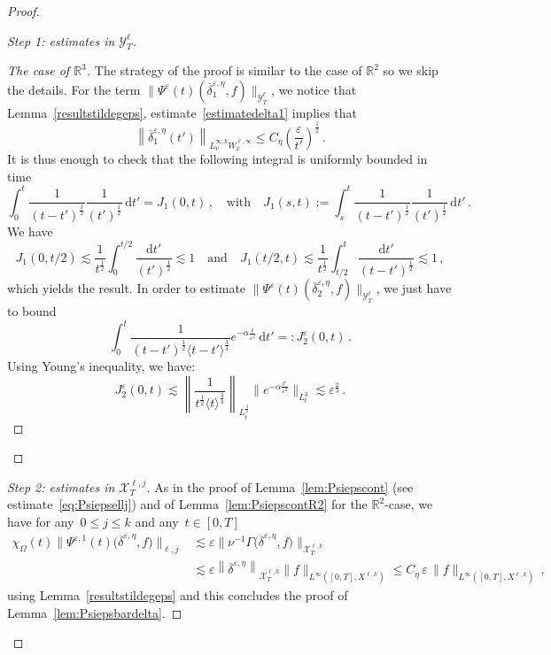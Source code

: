 \documentclass[11pt]{article}
\theoremstyle{definition}
\numberwithin{equation}{section}
\numberwithin{figure}{section}
\numberwithin{table}{section}
\newcommand*{\dd}{\mathrm{d}}
\newcommand*{\dt}{\dd t}
\newenvironment{step}[1]{\begin{proof}[#1]}{\let\qed\relax\end{proof}}
\newenvironment{laststep}[1]{\begin{proof}[#1]}{\end{proof}}
\newcommand*\R {\mathbb{R}}
\newcommand*\eps{{\varepsilon}}
\newcommand*\e{{\varepsilon}}
\begin{document}
\begin{proof}
\begin{step}{Step 1: estimates in $\mathcal{Y}^\ell_T$}
\begin{step}{The case of $\R^3$}
The strategy of the proof is similar to the case of $\R^2$ so we skip the details. For the term $\|\Psi^\eps(t) (\overline \delta^{\eps,\eta}_1, f)\|_{\mathcal{Y}^\ell_T}$, we notice that Lemma~\ref{resultstildegeps}, estimate~\eqref{estimatedelta1} implies that
\[
\left\|\overline \delta^{\eps,\eta}_1(t')\right\|_{L^{\infty,k}_v W^{\ell,\infty}_x} \le C_\eta \left(\frac{\eps}{t'}\right)^\frac12 \,.
\]
It is thus enough to check that the following integral is uniformly bounded in time
\[
\int_0^t \frac{1}{(t-t')^\frac12} \frac{1}{(t')^\frac12} \, \dt' =J_1(0,t)\,, \quad \text{with} \quad J_1(s,t):=\int_s^t \frac{1}{(t-t')^\frac12} \frac{1}{(t')^\frac12} \, \dt' \,.
\]
We have
\[
J_1(0,t/2) \lesssim \frac{1}{t^\frac12} \int_0^{t/2} \frac{\dt'}{(t')^\frac12} \lesssim 1
\quad \text{and} \quad J_1(t/2,t) \lesssim \frac{1}{t^\frac12} \int_{t/2}^t \frac{\dt'}{(t-t')^\frac12} \lesssim 1 \,,
\]
which yields the result. In order to estimate $\|\Psi^\eps(t) (\overline \delta^{\eps,\eta}_2, f)\|_{\mathcal{Y}^\ell_T}$, we just have to bound
\[
\int_0^t \frac{1}{{(t-t')^\frac12 \langle t-t' \rangle^\frac34}} e^{- \alpha \frac{t}{\eps^2}} \, \dt' =: J_2^\eps(0,t) \,.
\]
Using Young's inequality, we have:
\[
J_2^\eps(0,t) \lesssim \left\| \frac{1}{{t^{\frac12} \langle t \rangle^{\frac34}}}\right\|_{L^{\frac32}_t}\Big\|e^{- \alpha \frac{t'}{\eps^2}}\Big\|_{L^3_t} \lesssim \eps^{\frac23} \,.
\]
\end{step}
\end{step}

\begin{laststep}{Step 2: estimates in $\mathcal{X}^{\ell,j}_T$}
As in the proof of Lemma~\ref{lem:Psiepscont} (see estimate~\eqref{eq:Psiepsellj}) and of Lemma~\ref{lem:PsiepscontR2} for the $\R^2$-case, we have for any~$0 \le j \le k$ and any~$t\in [0,T]$
\begin{align*}
\chi_\Omega(t)\big\|\Psi^{\eps,1}(t)\big(\overline\delta^{\eps,\eta},f\big)\big\|_{{\ell,j}}
 &\lesssim \e \Big \| \nu^{-1} \Gamma\big(\overline\delta^{\eps,\eta},f\big) \Big\|_{\mathcal{X}_T^{\ell,k} } \\
&\lesssim \eps \left\|\overline\delta^{\eps,\eta}\right\|_{\mathcal{X}^{\ell,k}_T} \|f\|_{L^\infty([0,T],X^{\ell,k})}
\le C_\eta \, \eps \, \|f\|_{L^\infty([0,T],X^{\ell,k})}\,,
\end{align*}
using Lemma~\ref{resultstildegeps} and this concludes the proof of Lemma~\ref{lem:Psiepsbardelta}.
\end{laststep}
\let\qed\relax
\end{proof}
\end{document}
